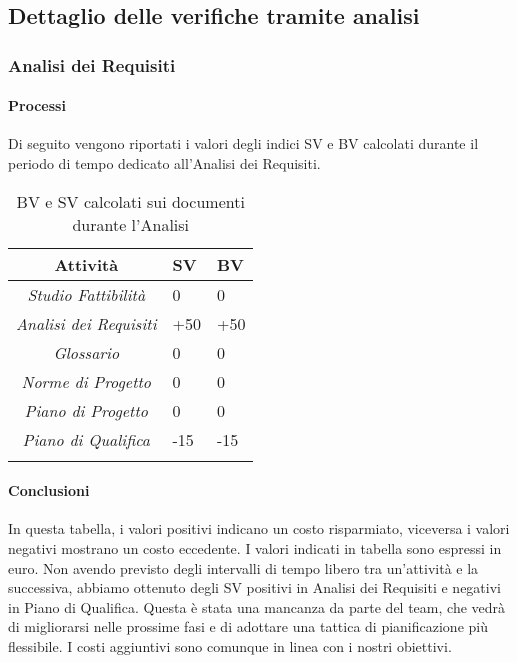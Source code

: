 \subsection{Dettaglio delle verifiche tramite analisi}
\subsubsection{Analisi dei Requisiti}
\paragraph{Processi}
Di seguito vengono riportati i valori degli indici SV e BV calcolati durante il periodo di tempo dedicato all'Analisi dei Requisiti.
\begin{longtable}{|c|p{3cm}|p{3cm}|}
\toprule
\textbf{Attività} & \textbf{SV} & \textbf{BV} \\


\midrule
\emph{Studio Fattibilità} & 0 & 0 \\
\midrule
\emph{Analisi dei Requisiti} & +50 & +50\\
\midrule
\emph{Glossario} & 0  & 0\\
\midrule
\emph{Norme di Progetto} & 0 & 0\\
\midrule
\emph{Piano di Progetto} & 0 & 0\\
\midrule
\emph{Piano di Qualifica} & -15 & -15\\
\bottomrule
\caption{BV e SV calcolati sui documenti durante l'Analisi}
\label{tab:changelog}
\end{longtable}

\paragraph{Conclusioni}
In questa tabella, i valori positivi indicano un costo risparmiato, viceversa i valori negativi mostrano un costo eccedente.
I valori indicati in tabella sono espressi in euro.
Non avendo previsto degli intervalli di tempo libero tra un'attività e la successiva, abbiamo ottenuto degli SV positivi in Analisi dei Requisiti e negativi in Piano di Qualifica.
Questa è stata una mancanza da parte del team, che vedrà di migliorarsi nelle prossime fasi e di adottare una tattica di pianificazione più flessibile.
I costi aggiuntivi sono comunque in linea con i nostri obiettivi.

